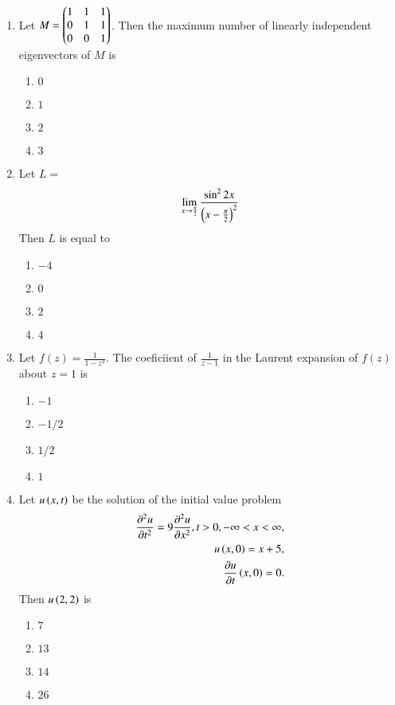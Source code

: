 \documentclass[journal]{IEEEtran}
\begin{document}
\begin{enumerate}
    \item Let $M = \begin{pmatrix}1&1&1\\0&1&1\\0&0&1\end{pmatrix}$. Then the maximum number of linearly independent eigenvectors of $M$ is
        \begin{enumerate}
            \item $0$
            \item $1$
            \item $2$
            \item $3$
        \end{enumerate}

    \item Let $L =$ $$\lim_{x \to \frac{\pi}{2}} \frac{\sin ^ 2 2x}{\left(x - \frac{\pi}{2}\right)^2}$$ Then $L$ is equal to
        \begin{enumerate}
            \item $-4$
            \item $0$
            \item $2$
            \item $4$
        \end{enumerate}

    \item Let $f(z) = \frac{1}{1-z^2}$. The coeficiient of $\frac{1}{z-1}$ in the Laurent expansion of $f(z)$ about $z=1$ is
        \begin{enumerate}
            \item $-1$
            \item $-1/2$
            \item $1/2$
            \item $1$
        \end{enumerate}

    \item Let $u\left(x,t\right)$ be the solution of the initial value problem 
    \begin{align*}
        \frac{\partial ^ 2 u}{\partial t^2} = 9 \frac{\partial ^ 2 u}{\partial x^2}, t>0, - \infty < x< \infty,\\
        u\left(x,0\right) = x+5,\\
        \frac{\partial u}{\partial t}\left(x,0\right) = 0.
    \end{align*}
    Then $u\left(2,2\right)$ is 
        \begin{enumerate}
            \item $7$
            \item $13$
            \item $14$
            \item $26$
        \end{enumerate}


\end{enumerate}
\end{document}
